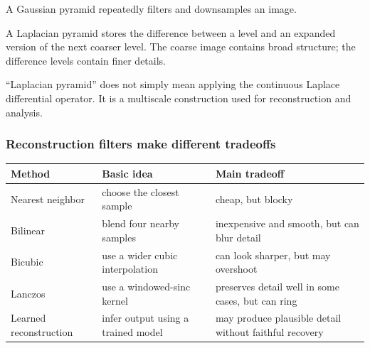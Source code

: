 A Gaussian pyramid repeatedly filters and downsamples an image.

A Laplacian pyramid stores the difference between a level and an expanded version of the next coarser level. The coarse image contains broad structure; the difference levels contain finer details.

``Laplacian pyramid'' does not simply mean applying the continuous Laplace differential operator. It is a multiscale construction used for reconstruction and analysis.

\subsubsection{Reconstruction filters make different tradeoffs}\label{04-visual-computing-ii-ch042-reconstruction-filters-make-different-tradeoffs}

\hypertarget{04-visual-computing-ii-ch042-reconstruction-filters-make-different-tradeoffs}{}

{\def\LTcaptype{none} %
\begin{longtable}[]{@{}
  >{\raggedright\arraybackslash}p{}
  >{\raggedright\arraybackslash}p{}
  >{\raggedright\arraybackslash}p{}@{}}
\toprule\noalign{}
\begin{minipage}[b]{\linewidth}\raggedright
Method
\end{minipage} & \begin{minipage}[b]{\linewidth}\raggedright
Basic idea
\end{minipage} & \begin{minipage}[b]{\linewidth}\raggedright
Main tradeoff
\end{minipage} \\
\midrule\noalign{}
\endhead
\bottomrule\noalign{}
\endlastfoot
Nearest neighbor & choose the closest sample & cheap, but blocky \\
Bilinear & blend four nearby samples & inexpensive and smooth, but can blur detail \\
Bicubic & use a wider cubic interpolation & can look sharper, but may overshoot \\
Lanczos & use a windowed-sinc kernel & preserves detail well in some cases, but can ring \\
Learned reconstruction & infer output using a trained model & may produce plausible detail without faithful recovery \\
\end{longtable}
}

